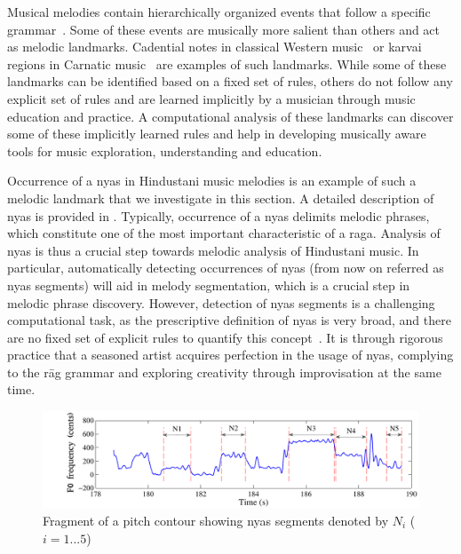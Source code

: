 {Musical melodies contain hierarchically organized events that follow a specific grammar~\citep{Patel07BOOK}. Some of these events are musically more salient than others and act as melodic landmarks. Cadential notes in classical Western music~\citep{GroveCadence} or \gls{karvai} regions in Carnatic music~\citep{sambamoorthy:1998} are examples of such landmarks. While some of these landmarks can be identified based on a fixed set of rules, others do not follow any explicit set of rules and are learned implicitly by a musician through music education and practice. A computational analysis of these landmarks can discover some of these implicitly learned rules and help in developing musically aware tools for music exploration, understanding and education. 

Occurrence of a \gls{nyas} in Hindustani music melodies is an example of such a melodic landmark that we investigate in this section. A detailed description of \gls{nyas} is provided in . Typically, occurrence of a \gls{nyas} delimits melodic phrases, which constitute one of the most important characteristic of a \gls{raga}. Analysis of \gls{nyas} is thus a crucial step towards melodic analysis of Hindustani music. In particular, automatically detecting occurrences of \gls{nyas} (from now on referred as \gls{nyas} segments) will aid in melody segmentation, which is a crucial step in melodic phrase discovery. However, detection of \gls{nyas} segments is a challenging computational task, as the prescriptive definition of \gls{nyas} is very broad, and there are no fixed set of explicit rules to quantify this concept~\citep[p. 73]{Dey2008}. It is through rigorous practice that a seasoned artist acquires perfection in the usage of \gls{nyas}, complying to the r\={a}g grammar and exploring creativity through improvisation at the same time. 


\begin{figure}
	\begin{center}
		\includegraphics[width=\figSizeHundred]{ch05_preprocessing/figures/NyasFragmentChallenge.pdf}
	\end{center}
	\caption[Fragment of a pitch contour showing \gls{nyas} segments]{Fragment of a pitch contour showing \gls{nyas} segments denoted by $N_i$ ($i={1...5}$)}
	\label{fig:nyas_segments_example}
\end{figure}

}
